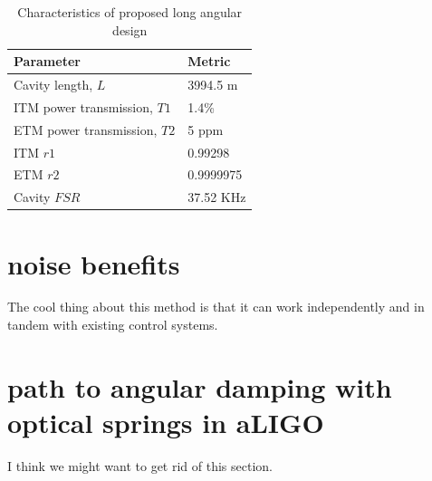 \begin{table}[htp]
\centering
\begin{tabular}{ l | l | }
\bf{Parameter}& \bf{Metric}  \\ \hline
Cavity length, $L$ & 3994.5 m \\ \hline
ITM power transmission, $T1$ & 1.4\% \\ \hline %
ETM power transmission, $T2$ & 5 ppm \\ \hline
ITM $r1$ & 0.99298 \\ \hline
ETM $r2$ &0.9999975 \\ \hline
Cavity $FSR$ & 37.52 KHz \\ \hline
\end{tabular}
\caption{Characteristics of proposed long angular design}
\label{tab:longproposal}
\end{table}

\section{noise benefits}

The cool thing about this method is that it can work independently and in tandem with existing control systems. 

\section{path to angular damping with optical springs in aLIGO}

I think we might want to get rid of this section.